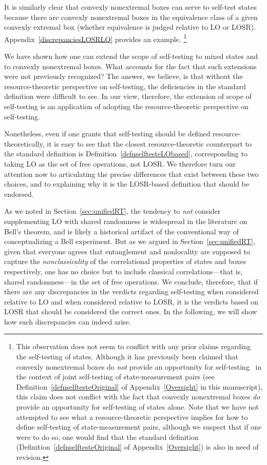 \documentclass[12pt]{article}
\theoremstyle{plain}
\theoremstyle{definition}
\begin{document}
It is similarly clear that 
convexly nonextremal boxes can serve to self-test states because there are convexly nonextremal boxes in the equivalence class of a given convexly extremal box (whether equivalence is judged relative to LO or LOSR).  Appendix~\ref{discrepanciesLOSRLO} provides an example. \footnote{This observation does not seem to conflict with any prior claims regarding the self-testing of states.  Although it has previously been claimed that convexly nonextremal boxes do {\em not} provide an opportunity for self-testing~\cite[Appendix C]{geometry2018} in the context of joint self-testing of state-measurement pairs (see Definition~\ref{defnselftesteOriginal} of Appendix~\ref{Oversight} in this manuscript), this claim does not conflict with the fact that convexly nonextremal boxes {\em do} provide an opportunity for self-testing of states alone.  Note that we have not attempted to see what a resource-theoretic perspective implies for how to define self-testing of state-measurement pairs, although we suspect that if one were to do so, one would find that the standard definition (Definition~\ref{defnselftesteOriginal} of Appendix~\ref{Oversight}) is also in need of revision.}

We have shown how one can extend the scope of self-testing to mixed states and to convexly nonextremal boxes. 
What accounts for the fact that such extensions  were not previously recognized?  The answer, we believe, is that without the resource-theoretic perspective on self-testing, the deficiencies in the standard definition were difficult to see.  In our view, therefore, the extension of scope of self-testing is an application of adopting the resource-theoretic perspective on self-testing. 


Nonetheless, even if one grants that self-testing should be defined resource-theoretically, it is easy to see that 
 the closest resource-theoretic counterpart to the standard definition is Definition~\ref{defnselftesteLObased}, corresponding to taking LO as the set of free operations, not LOSR.  We therefore turn our attention now to articulating the precise differences that exist between these two choices, and to explaining why it is the LOSR-based definition that should be endorsed. 


  As we noted in Section~\ref{sec:unifiedRT}, the tendency to {\em not} consider supplementing LO with shared randomness is widespread in the literature on Bell's theorem, and is likely 
a historical artifact of the conventional way of conceptualizing a Bell experiment.  
But as we argued in Section~\ref{sec:unifiedRT}, given that everyone agrees that entanglement and nonlocality are supposed to capture the {\em nonclassicality} of the correlational properties of states and boxes respectively, one has no choice but to include classical correlations---that is, shared randomness---in the set of free operations.   We conclude, therefore, that if there are any discrepancies in the verdicts regarding self-testing when considered relative to LO and when considered relative to LOSR, it is the verdicts based on LOSR that should be considered the correct ones.  In the following, we will show how such discrepancies can indeed arise.
\end{document}
